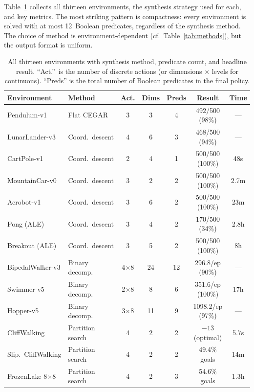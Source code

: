 \documentclass[9pt,a4paper]{article}
\theoremstyle{plain}
\theoremstyle{definition}
\theoremstyle{remark}
\begin{document}
Table~\ref{tab:all-results} collects all thirteen environments,
the synthesis strategy used for each, and key metrics.
The most striking pattern is compactness: every environment
is solved with at most 12~Boolean predicates, regardless of
the synthesis method.  The choice of method is
environment-dependent (cf.\ Table~\ref{tab:methods}), but the
output format is uniform.

\begin{table}[t]
\centering
\small
\begin{tabular}{@{}llccccc@{}}
\toprule
\textbf{Environment} & \textbf{Method} & \textbf{Act.} & \textbf{Dims}
  & \textbf{Preds} & \textbf{Result} & \textbf{Time} \\
\midrule
Pendulum-v1
  & Flat CEGAR & 3 & 3 & 4 & 492/500 (98\%) & --- \\
LunarLander-v3
  & Coord.\ descent & 4 & 6 & 3 & 468/500 (94\%) & --- \\
CartPole-v1
  & Coord.\ descent & 2 & 4 & 1 & 500/500 (100\%) & 48s \\
MountainCar-v0
  & Coord.\ descent & 3 & 2 & 2 & 500/500 (100\%) & 2.7m \\
Acrobot-v1
  & Coord.\ descent & 3 & 6 & 2 & 500/500 (100\%) & 23m \\
Pong (ALE)
  & Coord.\ descent & 3 & 4 & 2 & 170/500 (34\%) & 2.8h \\
Breakout (ALE)
  & Coord.\ descent & 3 & 5 & 2 & 500/500 (100\%) & 8h \\
\midrule
BipedalWalker-v3
  & Binary decomp. & 4$\times$8 & 24 & 12 & 296.8/ep (90\%) & --- \\
Swimmer-v5
  & Binary decomp. & 2$\times$8 & 8 & 6 & 351.6/ep (100\%) & 17h \\
Hopper-v5
  & Binary decomp. & 3$\times$8 & 11 & 9 & 1098.2/ep (97\%) & --- \\
\midrule
CliffWalking
  & Partition search & 4 & 2 & 2 & $-13$ (optimal) & 5.7s \\
Slip.\ CliffWalking
  & Partition search & 4 & 2 & 2 & 49.4\% goals & 14m \\
FrozenLake 8$\times$8
  & Partition search & 4 & 2 & 3 & 54.6\% goals & 1.3h \\
\bottomrule
\end{tabular}
\caption{All thirteen environments with synthesis method, predicate
count, and headline result.  ``Act.''\ is the number of discrete
actions (or dimensions $\times$ levels for continuous).  ``Preds''
is the total number of Boolean predicates in the final policy.}
\label{tab:all-results}
\end{table}
\end{document}
